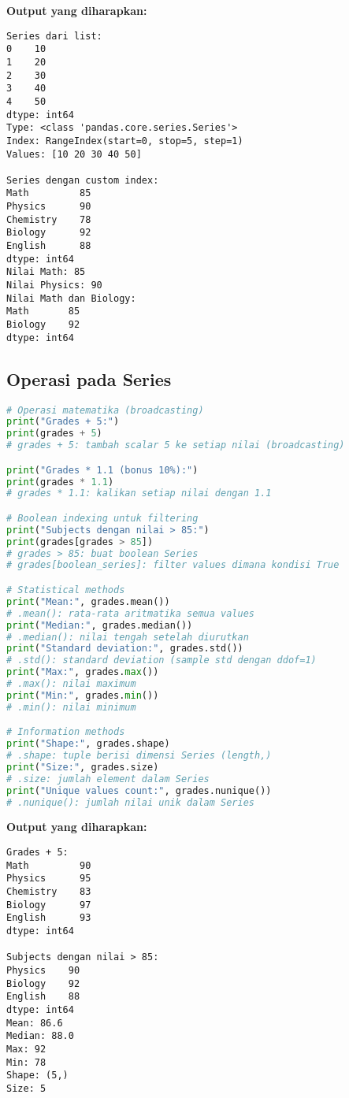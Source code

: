 \textbf{Output yang diharapkan:}
\begin{lstlisting}[style=bash]
Series dari list:
0    10
1    20
2    30
3    40
4    50
dtype: int64
Type: <class 'pandas.core.series.Series'>
Index: RangeIndex(start=0, stop=5, step=1)
Values: [10 20 30 40 50]

Series dengan custom index:
Math         85
Physics      90
Chemistry    78
Biology      92
English      88
dtype: int64
Nilai Math: 85
Nilai Physics: 90
Nilai Math dan Biology:
Math       85
Biology    92
dtype: int64
\end{lstlisting}

\subsection*{Operasi pada Series}

\begin{lstlisting}[language=python, caption={Mathematical dan Statistical Operations}, style=python]
# Operasi matematika (broadcasting)
print("Grades + 5:")
print(grades + 5)
# grades + 5: tambah scalar 5 ke setiap nilai (broadcasting)

print("Grades * 1.1 (bonus 10%):")
print(grades * 1.1)
# grades * 1.1: kalikan setiap nilai dengan 1.1

# Boolean indexing untuk filtering
print("Subjects dengan nilai > 85:")
print(grades[grades > 85])
# grades > 85: buat boolean Series
# grades[boolean_series]: filter values dimana kondisi True

# Statistical methods
print("Mean:", grades.mean())
# .mean(): rata-rata aritmatika semua values
print("Median:", grades.median())
# .median(): nilai tengah setelah diurutkan
print("Standard deviation:", grades.std())
# .std(): standard deviation (sample std dengan ddof=1)
print("Max:", grades.max())
# .max(): nilai maximum
print("Min:", grades.min())
# .min(): nilai minimum

# Information methods
print("Shape:", grades.shape)
# .shape: tuple berisi dimensi Series (length,)
print("Size:", grades.size)
# .size: jumlah element dalam Series
print("Unique values count:", grades.nunique())
# .nunique(): jumlah nilai unik dalam Series
\end{lstlisting}

\textbf{Output yang diharapkan:}
\begin{lstlisting}[style=bash]
Grades + 5:
Math         90
Physics      95
Chemistry    83
Biology      97
English      93
dtype: int64

Subjects dengan nilai > 85:
Physics    90
Biology    92
English    88
dtype: int64
Mean: 86.6
Median: 88.0
Max: 92
Min: 78
Shape: (5,)
Size: 5
\end{lstlisting}

